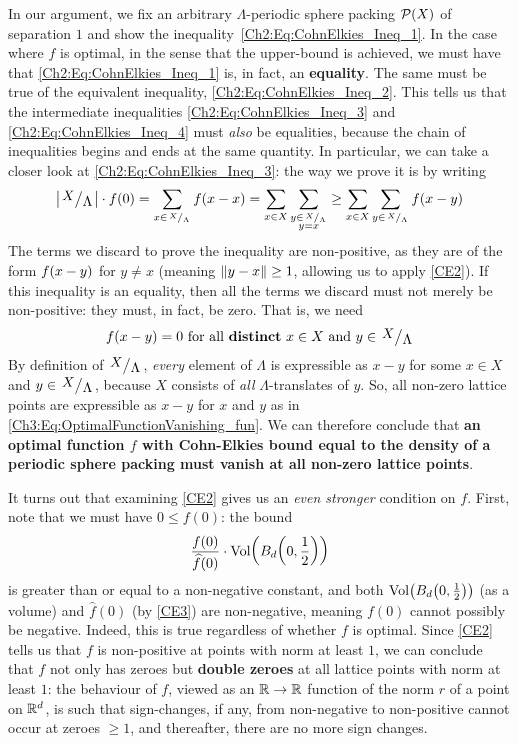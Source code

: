 In our argument, we fix an arbitrary $\Lambda$-periodic sphere packing $\mathcal{P}(X)$ of separation $1$ and show the inequality~\eqref{Ch2:Eq:CohnElkies_Ineq_1}. In the case where $f$ is optimal, in the sense that the upper-bound is achieved, we must have that \eqref{Ch2:Eq:CohnElkies_Ineq_1} is, in fact, an \textbf{equality}. The same must be true of the equivalent inequality, \eqref{Ch2:Eq:CohnElkies_Ineq_2}. This tells us that the intermediate inequalities \eqref{Ch2:Eq:CohnElkies_Ineq_3} and \eqref{Ch2:Eq:CohnElkies_Ineq_4} must \textit{also} be equalities, because the chain of inequalities begins and ends at the same quantity. In particular, we can take a closer look at \eqref{Ch2:Eq:CohnElkies_Ineq_3}: the way we prove it is by writing
\begin{align*}
    \abs{\quotient{X}{\Lambda}}  \cdot f(0)
    = \sum_{x \in {\tiny{\quotient{X}{\Lambda}}}} \fof{x - x}
    = \sum_{x \in X} \sum_{\substack{y \in {\tiny \quotient{X}{\Lambda}} \\ y = x}}
    \geq \sum_{x \in X} \sum_{y \in {\tiny \quotient{X}{\Lambda}}} \fof{x - y}
\end{align*}
The terms we discard to prove the inequality are non-positive, as they are of the form $f\!\left( x - y \right)$ for $y \neq x$ (meaning $\left\lVert y - x \right\rVert \geq 1$, allowing us to apply \ref{CE2}). If this inequality is an equality, then all the terms we discard must not merely be non-positive: they must, in fact, be zero. That is, we need
\begin{align}
    \fof{x - y} = 0 \text{ for all \textbf{distinct} } x \in X \text{ and } y \in \quotient{X}{\Lambda}
    \label{Ch3:Eq:OptimalFunctionVanishing_fun}
\end{align}
By definition of $\quotient{X}{\Lambda}$, \textit{every} element of $\Lambda$ is expressible as $x - y$ for some $x \in X$ and $y \in \quotient{X}{\Lambda}$, because $X$ consists of \textit{all} $\Lambda$-translates of $y$. So, all non-zero lattice points are expressible as $x - y$ for $x$ and $y$ as in \eqref{Ch3:Eq:OptimalFunctionVanishing_fun}. We can therefore conclude that \textbf{an optimal function $f$ with Cohn-Elkies bound equal to the density of a periodic sphere packing must vanish at all non-zero lattice points}.

It turns out that examining \ref{CE2} gives us an \textit{even stronger} condition on $f$. First, note that we must have $0 \leq f(0)$: the bound
\begin{align*}
    \frac{f(0)}{\widehat{f}(0)} \cdot \operatorname{Vol}\!\left( B_d\!\left( 0, \frac{1}{2} \right) \right)
\end{align*}
is greater than or equal to a non-negative constant, and both $\operatorname{Vol}\!\left( B_d\!\left( 0, \frac{1}{2} \right) \right)$ (as a volume) and $\hat{f}(0)$ (by \ref{CE3}) are non-negative, meaning $f(0)$ cannot possibly be negative. Indeed, this is true regardless of whether $f$ is optimal. Since \ref{CE2} tells us that $f$ is non-positive at points with norm at least $1$, we can conclude that $f$ not only has zeroes but \textbf{double zeroes} at all lattice points with norm at least $1$: the behaviour of $f$, viewed as an $\mathbb{R} \to \mathbb{R}$ function of the norm $r$ of a point on $\mathbb{R}^d$, is such that sign-changes, if any, from non-negative to non-positive cannot occur at zeroes $\geq 1$, and thereafter, there are no more sign changes.


